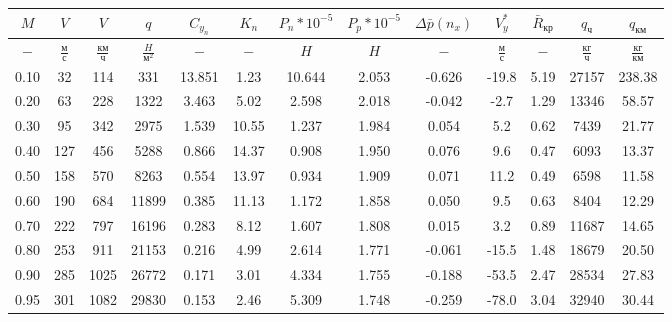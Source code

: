 \begin{tabular}{|c|c|c|c|c|c|c|c|c|c|c|c|c|}
\hline
$M$ & $V$ & $V$ & $q$ & $C_{y_n}$ & $K_n$ & $P_n*10^{-5}$ & $P_p*10^{-5}$ & $\Delta \bar{p}(n_x)$ & $V_y^*$ & $\bar{R}_{кр}$ & $q_{ч}$ & $q_{км}$ \\ 
\hline
$-$ & $\frac{м}{с}$ & $\frac{км}{ч}$ & $\frac{H}{м^2}$ & $-$ & $-$ & $H$ & $H$ & $-$ & $\frac{м}{с}$ & $-$ & $\frac{кг}{ч}$ & $\frac{кг}{км}$ \\ 
\hline
0.10 & 32 & 114 & 331 & 13.851 & 1.23 & 10.644 & 2.053 & -0.626 & -19.8 & 5.19 & 27157 & 238.38 \\ 
\hline
0.20 & 63 & 228 & 1322 & 3.463 & 5.02 & 2.598 & 2.018 & -0.042 & -2.7 & 1.29 & 13346 & 58.57 \\ 
\hline
0.30 & 95 & 342 & 2975 & 1.539 & 10.55 & 1.237 & 1.984 & 0.054 & 5.2 & 0.62 & 7439 & 21.77 \\ 
\hline
0.40 & 127 & 456 & 5288 & 0.866 & 14.37 & 0.908 & 1.950 & 0.076 & 9.6 & 0.47 & 6093 & 13.37 \\ 
\hline
0.50 & 158 & 570 & 8263 & 0.554 & 13.97 & 0.934 & 1.909 & 0.071 & 11.2 & 0.49 & 6598 & 11.58 \\ 
\hline
0.60 & 190 & 684 & 11899 & 0.385 & 11.13 & 1.172 & 1.858 & 0.050 & 9.5 & 0.63 & 8404 & 12.29 \\ 
\hline
0.70 & 222 & 797 & 16196 & 0.283 & 8.12 & 1.607 & 1.808 & 0.015 & 3.2 & 0.89 & 11687 & 14.65 \\ 
\hline
0.80 & 253 & 911 & 21153 & 0.216 & 4.99 & 2.614 & 1.771 & -0.061 & -15.5 & 1.48 & 18679 & 20.50 \\ 
\hline
0.90 & 285 & 1025 & 26772 & 0.171 & 3.01 & 4.334 & 1.755 & -0.188 & -53.5 & 2.47 & 28534 & 27.83 \\ 
\hline
0.95 & 301 & 1082 & 29830 & 0.153 & 2.46 & 5.309 & 1.748 & -0.259 & -78.0 & 3.04 & 32940 & 30.44 \\ 
\hline
\end{tabular}